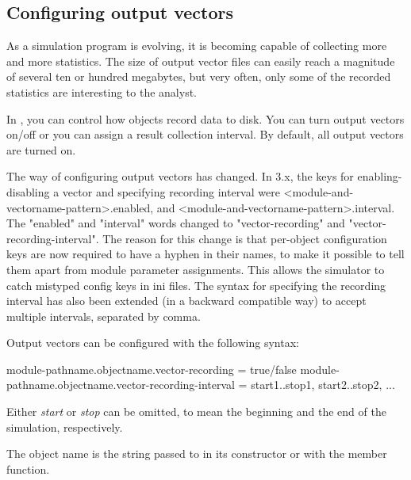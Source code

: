 \subsection{Configuring output vectors}
\label{sec:ch-config-sim:outvectors}


As a simulation program is evolving, it is becoming capable of
collecting more and more statistics. The size of output vector
files can easily reach a magnitude of
several ten or hundred megabytes, but very often, only some of the
recorded statistics are interesting to the analyst.

In {\opp}, you can control how  objects record data
to disk. You can turn output vectors on/off or you can assign a result
collection interval. By default, all output vectors are turned on.


\begin{note}
    The way of configuring output vectors has changed. In {\opp} 3.x,
    the keys for enabling-disabling a vector and specifying recording
    interval were <module-and-vectorname-pattern>.enabled, and
    <module-and-vectorname-pattern>.interval. The "enabled" and "interval"
    words changed to "vector-recording" and "vector-recording-interval".
    The reason for this change is that per-object
    configuration keys are now required to have a hyphen in their names, to
    make it possible to tell them apart from module parameter assignments.
    This allows the simulator to catch mistyped config keys in ini files.
    The syntax for specifying the recording interval has also been extended
    (in a backward compatible way) to accept multiple intervals, separated
    by comma.
\end{note}


Output vectors can be configured with the following syntax:

\begin{inifile}
module-pathname.objectname.vector-recording = true/false
module-pathname.objectname.vector-recording-interval = start1..stop1,
                                                       start2..stop2, ...
\end{inifile}

Either \textit{start} or \textit{stop} can be omitted, to mean the
beginning and the end of the simulation, respectively.


The object name is the string passed to  in its constructor
or with the  member function.

